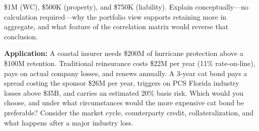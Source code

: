 \documentclass[11pt,openany]{book}
\begin{document}
\begin{discussionquestions}
  \$1M (WC), \$500K (property), and \$750K (liability). Explain
  conceptually---no calculation required---why the portfolio view supports
  retaining more in aggregate, and what feature of the correlation matrix
  would reverse that conclusion.
\item \textbf{Application:} A coastal insurer needs \$200M of hurricane
  protection above a \$100M retention. Traditional reinsurance costs \$22M
  per year (11\% rate-on-line), pays on actual company losses, and renews
  annually. A 3-year cat bond pays a spread costing the sponsor \$26M per
  year, triggers on PCS Florida industry losses above \$35B, and carries an
  estimated 20\% basis risk. Which would you choose, and under what
  circumstances would the more expensive cat bond be preferable? Consider the
  market cycle, counterparty credit, collateralization, and what happens
  after a major industry loss.
\end{discussionquestions}
\end{document}
